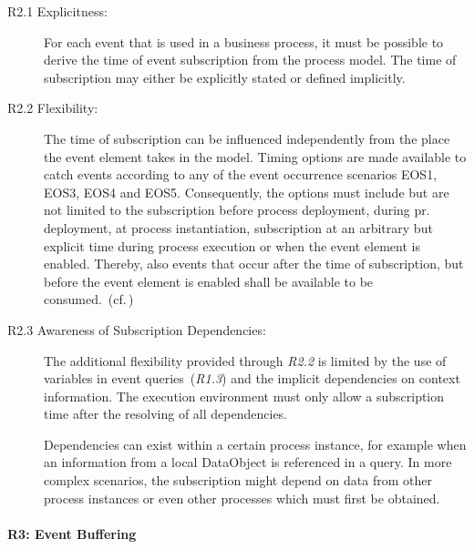 \begin{description}
	\item[R2.1 Explicitness:] 
	For each event that is used in a business process, it must be possible to derive the time of event subscription from the process model. The time of subscription may either be explicitly stated or defined implicitly.
	\item[R2.2 Flexibility:] 
	The time of subscription can be influenced independently from the place the event element takes in the model. Timing options are made available to catch events according to any of the event occurrence scenarios EOS1, EOS3, EOS4 and EOS5. 
	Consequently, the options must include but are not limited to the subscription before process deployment, during  pr. deployment, at process instantiation, subscription at an arbitrary but explicit time during process execution or when the event element is enabled.
	Thereby, also events that occur after the time of subscription, but before the event element is enabled shall be available to be consumed.~(cf.\,\cite{mandal:2017})
	\item[R2.3 Awareness of Subscription Dependencies:]
	The additional flexibility provided through \textit{R2.2} is limited by the use of variables in event queries~(\textit{R1.3}) and the implicit dependencies on context information.
	The execution environment must only allow a subscription time after the resolving of all dependencies.
	
	Dependencies can exist within a certain process instance, for example when an information from a local DataObject is referenced in a query. In more complex scenarios, the subscription might depend on data from other process instances or even other processes which must first be obtained.
\end{description}


\paragraph{R3: Event Buffering}

